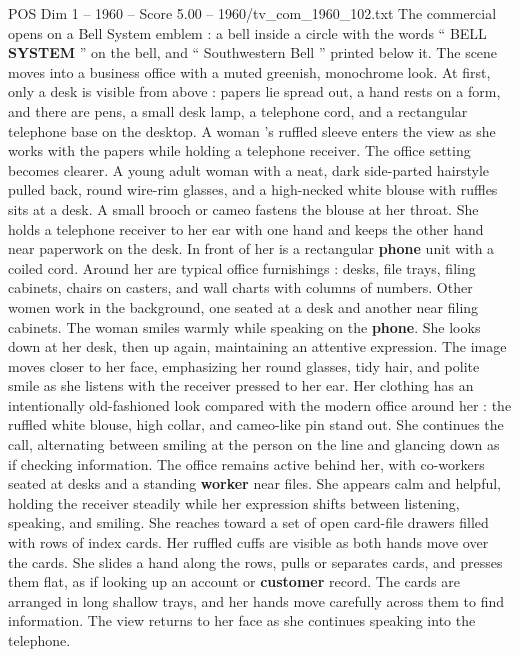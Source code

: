 \begin{textsample}{POS Dim 1 – 1960 – Score 5.00 – 1960/tv\_com\_1960\_102.txt}  \label{ex:f1_pos_073}
The commercial opens on a Bell System emblem : a bell inside a circle with the words “ BELL \textbf{SYSTEM} ” on the bell, and “ Southwestern Bell ” printed below it.
The scene moves into a business office with a muted greenish, monochrome look.
At first, only a desk is visible from above : papers lie spread out, a hand rests on a form, and there are pens, a small desk lamp, a telephone cord, and a rectangular telephone base on the desktop.
A woman ’s ruffled sleeve enters the view as she works with the papers while holding a telephone receiver.
The office setting becomes clearer.
A young adult woman with a neat, dark side-parted hairstyle pulled back, round wire-rim glasses, and a high-necked white blouse with ruffles sits at a desk.
A small brooch or cameo fastens the blouse at her throat.
She holds a telephone receiver to her ear with one hand and keeps the other hand near paperwork on the desk.
In front of her is a rectangular \textbf{phone} unit with a coiled cord.
Around her are typical office furnishings : desks, file trays, filing cabinets, chairs on casters, and wall charts with columns of numbers.
Other women work in the background, one seated at a desk and another near filing cabinets.
The woman smiles warmly while speaking on the \textbf{phone}.
She looks down at her desk, then up again, maintaining an attentive expression.
The image moves closer to her face, emphasizing her round glasses, tidy hair, and polite smile as she listens with the receiver pressed to her ear.
Her clothing has an intentionally old-fashioned look compared with the modern office around her : the ruffled white blouse, high collar, and cameo-like pin stand out.
She continues the call, alternating between smiling at the person on the line and glancing down as if checking information.
The office remains active behind her, with co-workers seated at desks and a standing \textbf{worker} near files.
She appears calm and helpful, holding the receiver steadily while her expression shifts between listening, speaking, and smiling.
She reaches toward a set of open card-file drawers filled with rows of index cards.
Her ruffled cuffs are visible as both hands move over the cards.
She slides a hand along the rows, pulls or separates cards, and presses them flat, as if looking up an account or \textbf{customer} record.
The cards are arranged in long shallow trays, and her hands move carefully across them to find information.
The view returns to her face as she continues speaking into the telephone.

\end{textsample}
